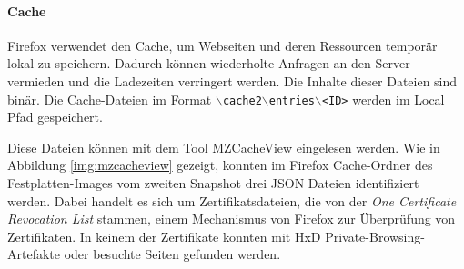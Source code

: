 \begin{appendices}
\paragraph*{Cache}
Firefox verwendet den Cache, um Webseiten und deren Ressourcen temporär lokal zu speichern. Dadurch können wiederholte Anfragen an den Server vermieden und die Ladezeiten verringert werden. Die Inhalte dieser Dateien sind binär.
Die Cache-Dateien im Format \texttt{$\backslash$cache2$\backslash$entries$\backslash$<ID>} werden im Local Pfad gespeichert.

Diese Dateien können mit dem Tool MZCacheView eingelesen werden.
Wie in Abbildung \ref{img:mzcacheview} gezeigt, konnten im Firefox Cache-Ordner des Festplatten-Images vom zweiten Snapshot drei JSON Dateien identifiziert werden. Dabei handelt es sich um Zertifikatsdateien, die von der \textit{One Certificate Revocation List} stammen, einem Mechanismus von Firefox zur Überprüfung von Zertifikaten. In keinem der Zertifikate konnten mit HxD Private-Browsing-Artefakte oder besuchte Seiten gefunden werden. \cite{TechSupportGuy.05.06.2023}
{}
\end{appendices}
